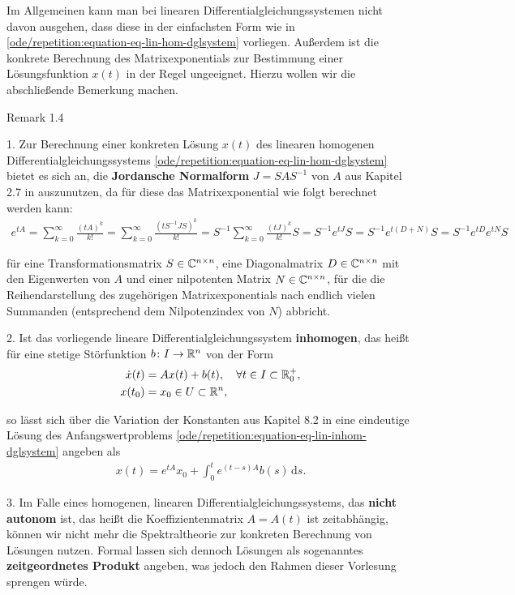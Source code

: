 \par
Im Allgemeinen kann man bei linearen Differentialgleichungssystemen nicht davon ausgehen, dass diese in der einfachsten Form wie in \cref{ode/repetition:equation-eq-lin-hom-dglsystem} vorliegen.
Außerdem ist die konkrete Berechnung des Matrixexponentials zur Bestimmung einer Lösungsfunktion \(x(t)\) in der Regel ungeeignet.
Hierzu wollen wir die abschließende Bemerkung machen.
\label{ode/repetition:remark-16}
\begin{emphBox}{}{}{Remark 1.4}



\par
1. Zur Berechnung einer konkreten Lösung \(x(t)\) des linearen homogenen Differentialgleichungssystems \cref{ode/repetition:equation-eq-lin-hom-dglsystem} bietet es sich an, die \textbf{Jordansche Normalform} \(J = SAS^{-1}\) von \(A\) aus Kapitel 2.7 in \cite{Ten21} auszunutzen, da für diese das Matrixexponential wie folgt berechnet werden kann:
\begin{align*}
e^{tA} =  \sum_{k=0}^\infty \frac{(t A)^k}{k!} = \sum_{k=0}^\infty \frac{(tS^{-1}JS)^k}{k!} = S^{-1} \sum_{k=0}^\infty \frac{(tJ)^k}{k!} S = S^{-1} e^{tJ}S = S^{-1} e^{t(D+N)}S = S^{-1} e^{tD} e^{tN} S
\end{align*}
\par
für eine Transformationsmatrix \(S \in \mathbb{C}^{n \times n}\), eine Diagonalmatrix \(D \in \mathbb{C}^{n \times n}\) mit den Eigenwerten von \(A\) und einer nilpotenten Matrix \(N \in \mathbb{C}^{n \times n}\), für die die Reihendarstellung des zugehörigen Matrixexponentials nach endlich vielen Summanden (entsprechend dem Nilpotenzindex von \(N\)) abbricht.

\par
2. Ist das vorliegende lineare Differentialgleichungssystem \textbf{inhomogen}, das heißt für eine stetige Störfunktion \(b \colon I \rightarrow \mathbb{R}^n\) von der Form
\begin{align}\label{equation:ode/repetition:eq:lin_inhom_dglsystem}
\dot{x}(t) &= A x(t) + b(t), \quad \forall t \in I \subset \mathbb{R}^+_0, \\
x(t_0) &= x_0 \in U \subset \mathbb{R}^n,
\end{align}
\par
so lässt sich über die Variation der Konstanten aus Kapitel 8.2 in \cite{Ten21} eine eindeutige Lösung des Anfangswertproblems \cref{ode/repetition:equation-eq-lin-inhom-dglsystem} angeben als
\begin{align*}
x(t) = e^{tA}x_0 + \int_0^t e^{(t-s)A}b(s) \, \mathrm{d}s.
\end{align*}
\par
3. Im Falle eines homogenen, linearen Differentialgleichungssystems, das \textbf{nicht autonom} ist, das heißt die Koeffizientenmatrix \(A = A(t)\) ist zeitabhängig, können wir nicht mehr die Spektraltheorie zur konkreten Berechnung von Lösungen nutzen.
Formal lassen sich dennoch Lösungen als sogenanntes \textbf{zeitgeordnetes Produkt} angeben, was jedoch den Rahmen dieser Vorlesung sprengen würde.
\end{emphBox}


